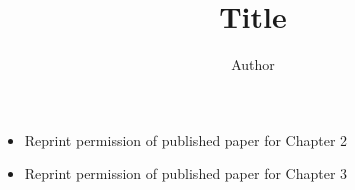 \documentclass[12pt,frontmatter,copyright,dissertation]{usfmanus}
\title{Title}
\author{Author}
\begin{document}








%

%














\chapter*{\vspace*{0.65in}{Appendix A: \ Title}}





\chapter*{\vspace*{0.65in}{Appendix B: \ Copyright Permissions}}

\begin{itemize}

\item Reprint permission of published paper for Chapter 2
   


\newpage

\item Reprint permission of published paper for Chapter 3



 
 
 

 \end{itemize}
 



\clearpage
\end{document}
